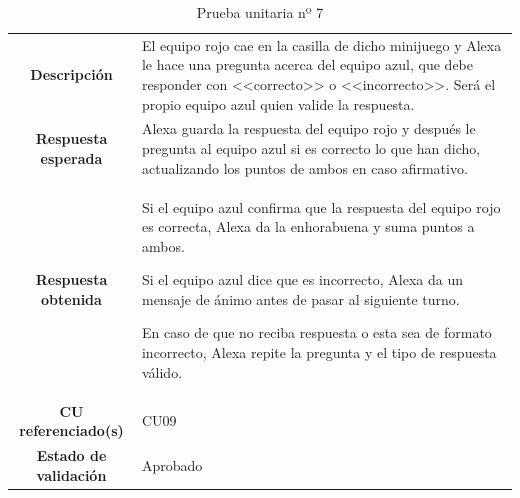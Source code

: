 \begin{table}[H]
	\centering
	\begin{tabular}{|c|p{9.3cm}|}
		\hline
		\rowcolor{lightgray}
		\multicolumn{2}{|c|}{\textbf{PU07}: Minijuego conoce a tus compañeros} \\
		\hline
		\textbf{Descripción} & El equipo rojo cae en la casilla de dicho minijuego y Alexa le hace una pregunta acerca del equipo azul, que debe responder con <<correcto>> o <<incorrecto>>. Será el propio equipo azul quien valide la respuesta.
		\vspace{0.2cm} \\
		\hline
		\textbf{Respuesta esperada} & Alexa guarda la respuesta del equipo rojo y después le pregunta al equipo azul si es correcto lo que han dicho, actualizando los puntos de ambos en caso afirmativo. \vspace{0.2cm} \\
		\hline
		\textbf{Respuesta obtenida} & Si el equipo azul confirma que la respuesta del equipo rojo es correcta, Alexa da la enhorabuena y suma puntos a ambos.
		
		Si el equipo azul dice que es incorrecto, Alexa da un mensaje de ánimo antes de pasar al siguiente turno.
		
		En caso de que no reciba respuesta o esta sea de formato incorrecto, Alexa repite la pregunta y el tipo de respuesta válido. \\
		\hline
		\textbf{CU referenciado(s)} & CU09 \vspace{0.2cm} \\
		\hline
		\textbf{Estado de validación} & Aprobado \vspace{0.2cm} \\
		\hline
	\end{tabular}
	\caption{Prueba unitaria nº 7}
	\label{tab:PU07}
\end{table}

